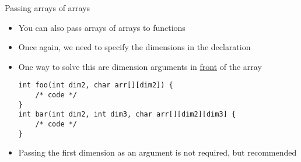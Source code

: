 %
\begin{frame}[fragile]{Passing arrays of arrays}
	\begin{itemize}
		\item You can also pass arrays of arrays to functions
		\item Once again, we need to specify the dimensions in the declaration
		\item One way to solve this are dimension arguments in \underline{front} of the array
		\begin{lstlisting}[numbers=none]
int foo(int dim2, char arr[][dim2]) {
	/* code */
}
int bar(int dim2, int dim3, char arr[][dim2][dim3] {
	/* code */
}
\end{lstlisting}
		\item Passing the first dimension as an argument is not required, but recommended
	\end{itemize}
\end{frame}

